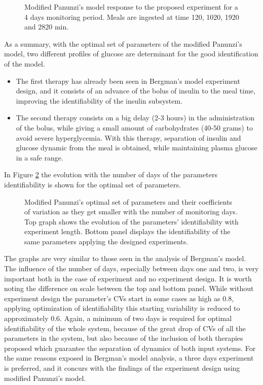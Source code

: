 \begin{figure}[hbt]
\centering
{}\caption{Modified Panunzi's model response to the proposed experiment for a 4 days monitoring period. Meals are ingested at time 120, 1020, 1920 and 2820 min.}
\label{fig:optdesignpanunzi4day}
\end{figure}

As a summary, with the optimal set of parameters of the modified Panunzi's model, two different profiles of glucose are determinant for the good identification of the model.
\begin{itemize}
	\item The first therapy has already been seen in Bergman's model experiment design, and it consists of an advance of the bolus of insulin to the meal time, improving the identifiability of the insulin subsystem.
	\item The second therapy consists on a big delay (2-3 hours) in the administration of the bolus, while giving a small amount of carbohydrates (40-50 grams) to avoid severe hyperglycemia. With this therapy, separation of insulin and glucose dynamic from the meal is obtained, while maintaining plasma glucose in a safe range.
\end{itemize}

In Figure \ref{fig:panunzidays} the evolution with the number of days of the parameters identifiability is shown for the optimal set of parameters.

\begin{figure}[hbtp]
\centering
{}\caption{Modified Panunzi's optimal set of parameters and their coefficients of variation as they get smaller with the number of monitoring days. Top graph shows the evolution of the parameters' identifiability with experiment length. Bottom panel displays the identifiability of the same parameters applying the designed experiments.}
\label{fig:panunzidays}
\end{figure}

The graphs are very similar to those seen in the analysis of Bergman's model. The influence of the number of days, especially between days one and two, is very important both in the case of experiment and no experiment design. It is worth noting the difference on scale between the top and bottom panel. While without experiment design the parameter's CVs start in some cases as high as 0.8, applying optimization of identifiability this starting variability is reduced to approximately 0.6. Again, a minimum of two days is required for optimal identifiability of the whole system, because of the great drop of CVs of all the parameters in the system, but also because of the inclusion of both therapies proposed which guarantee the separation of dynamics of both input systems. For the same reasons exposed in Bergman's model analysis, a three days experiment is preferred, and it concurs with the findings of the experiment design using modified Panunzi's model.

